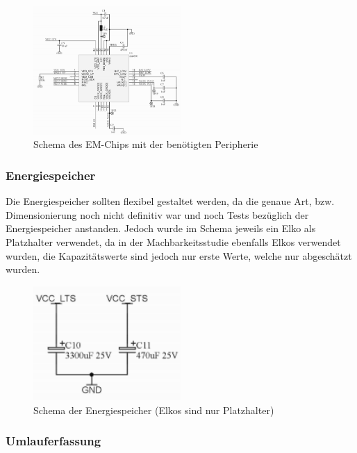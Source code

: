 \begin{figure}[ht]
    \includegraphics[width=0.5\textwidth]{3Vorgehen/imag/Schema_EM-Chip_inkl_Peripherie.png}
    \caption{Schema des EM-Chips mit der benötigten Peripherie}\label{schema_em-chip_inkl_peripherie} 
\end{figure}

\subsubsection{Energiespeicher}

Die Energiespeicher sollten flexibel gestaltet werden, da die genaue Art, bzw. Dimensionierung noch nicht definitiv war und noch Tests bezüglich der Energiespeicher anstanden. Jedoch wurde im Schema jeweils ein Elko als Platzhalter verwendet, da in der Machbarkeitsstudie ebenfalls Elkos verwendet wurden, die Kapazitätswerte sind jedoch nur erste Werte, welche nur abgeschätzt wurden.

\begin{figure}[ht]
    \includegraphics[width=0.5\textwidth]{3Vorgehen/imag/Schema_Energiespeicher.png}
    \caption{Schema der Energiespeicher (Elkos sind nur Platzhalter)}
    \label{schema_energiespeicher} 
\end{figure}

\subsubsection{Umlauferfassung}

